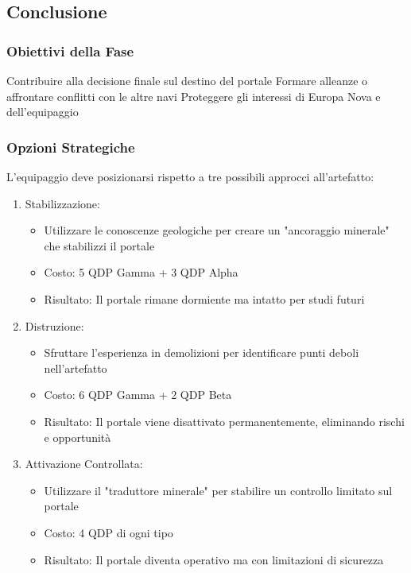 \documentclass[letterpaper,twocolumn,openany,nodeprecatedcode]{dndbook}
\begin{document}
\subsection{Conclusione}
\subsubsection{Obiettivi della Fase}

Contribuire alla decisione finale sul destino del portale
Formare alleanze o affrontare conflitti con le altre navi
Proteggere gli interessi di Europa Nova e dell'equipaggio

\subsubsection{Opzioni Strategiche}
L'equipaggio deve posizionarsi rispetto a tre possibili approcci all'artefatto:

\begin{enumerate}
    \item Stabilizzazione:
    \begin{itemize}
        
    \item Utilizzare le conoscenze geologiche per creare un "ancoraggio minerale" che stabilizzi il portale
    \item Costo: 5 QDP Gamma + 3 QDP Alpha
    \item Risultato: Il portale rimane dormiente ma intatto per studi futuri
    
    \end{itemize} 
    \item Distruzione:
    \begin{itemize}
        
    
    \item Sfruttare l'esperienza in demolizioni per identificare punti deboli nell'artefatto
    \item Costo: 6 QDP Gamma + 2 QDP Beta
    \item Risultato: Il portale viene disattivato permanentemente, eliminando rischi e opportunità
    \end{itemize}
    
    \item Attivazione Controllata:
    \begin{itemize}
    
    \item Utilizzare il "traduttore minerale" per stabilire un controllo limitato sul portale
    \item Costo: 4 QDP di ogni tipo
    \item Risultato: Il portale diventa operativo ma con limitazioni di sicurezza
    \end{itemize}
\end{enumerate}
\end{document}
